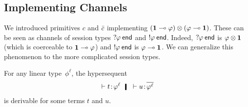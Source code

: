     \subsection{Implementing Channels}
    We introduced primitives $c$ and $\bar{c}$ implementing
    $(\mathbf{1}\multimap\varphi)\otimes(\varphi\multimap\mathbf{1})$.
    These can be seen as channels of session types
    $\mathop{?}\kern -2pt{\varphi}\hskip 2pt{\mathsf{end}}$ and $\mathop{!}\kern -2pt{\varphi}\hskip 2pt{\mathsf{end}}$.
    Indeed, $\mathop{?}\kern -2pt{\varphi}\hskip 2pt{\mathsf{end}}$ is $\varphi\otimes\mathbf{1}$ (which is
    coerceable to $\mathbf{1}\multimap\varphi$) and $\mathop{!}\kern -2pt{\varphi}\hskip 2pt{\mathsf{end}}$ is
    $\varphi\multimap \mathbf{1}$.
    We can generalize this phenomenon to the more complicated session
    types.
     \begin{proposition}
      For any linear type~$\phi^\ell$\kern -2pt, the hypersequent
      \[
       \tr\tj{t}{\phi^\ell}\hmid \tr\tj{u}{\overline{\phi^\ell}}
      \]
      is derivable for some terms $t$ and $u$.
     \end{proposition}

